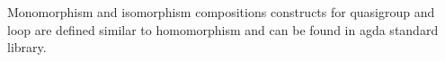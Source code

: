 \begin{comment}
\begin{Verbatim}[commandchars=\\\{\},samepage=true]
  isLoopMonomorphism : IsLoopMonomorphism L\textsubscript{1} L\textsubscript{2} f
    → IsLoopMonomorphism L\textsubscript{2} L\textsubscript{3} g → IsLoopMonomorphism L\textsubscript{1} L\textsubscript{3} (g ∘ f)
  isLoopMonomorphism f-mono g-mono = record
    \{ isLoopHomomorphism = isLoopHomomorphism F.isLoopHomomorphism 
				G.isLoopHomomorphism
    ; injective = F.injective ∘ G.injective
    \} where module F = IsLoopMonomorphism f-mono; 
                 module G = IsLoopMonomorphism g-mono
\end{Verbatim}
\begin{Verbatim}[commandchars=\\\{\},samepage=true]
  isLoopIsomorphism : IsLoopIsomorphism L\textsubscript{1} L\textsubscript{2} f
    → IsLoopIsomorphism L\textsubscript{2} L\textsubscript{3} g → IsLoopIsomorphism L\textsubscript{1} L\textsubscript{3} (g ∘ f)
  isLoopIsomorphism f-iso g-iso = record
    \{ isLoopMonomorphism = isLoopMonomorphism F.isLoopMonomorphism G.isLoopMonomorphism
    ; surjective               = Func.surjective (_≈_ L\textsubscript{1}) (_≈_ L\textsubscript{2}) (_≈_ L\textsubscript{3})
				 ≈\textsubscript{3}-trans G.⟦⟧-cong F.surjective G.surjective
    \} where module F = IsLoopIsomorphism f-iso; 
                 module G = IsLoopIsomorphism g-iso
\end{Verbatim}
\end{comment}

Monomorphism and isomorphism compositions constructs for quasigroup and loop are defined similar to homomorphism and can be found in agda standard library.
